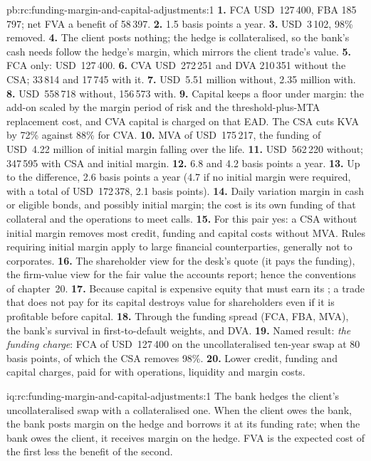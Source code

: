\begin{solution}{pb:rc:funding-margin-and-capital-adjustments:1}
\textbf{1.} FCA USD~127\,400, FBA 185\,797; net FVA a benefit of 58\,397.
\textbf{2.} 1.5 basis points a year.
\textbf{3.} USD~3\,102, 98\% removed.
\textbf{4.} The client posts nothing; the hedge is collateralised, so the bank's cash needs follow
the hedge's margin, which mirrors the client trade's value.
\textbf{5.} FCA only: USD~127\,400.
\textbf{6.} CVA USD~272\,251 and DVA 210\,351 without the CSA; 33\,814 and 17\,745 with it.
\textbf{7.} USD~5.51 million without, 2.35 million with.
\textbf{8.} USD~558\,718 without, 156\,573 with.
\textbf{9.} Capital keeps a floor under margin: the add-on scaled by the margin period of risk and
the threshold-plus-MTA replacement cost, and CVA capital is charged on that EAD. The CSA cuts
KVA by 72\% against 88\% for CVA.
\textbf{10.} MVA of USD~175\,217, the funding of USD~4.22 million of initial margin falling over
the life.
\textbf{11.} USD~562\,220 without; 347\,595 with CSA and initial margin.
\textbf{12.} 6.8 and 4.2 basis points a year.
\textbf{13.} Up to the difference, 2.6 basis points a year (4.7 if no initial margin were
required, with a total of USD~172\,378, 2.1 basis points).
\textbf{14.} Daily variation margin in cash or eligible bonds, and possibly initial margin; the
cost is its own funding of that collateral and the operations to meet calls.
\textbf{15.} For this pair yes: a CSA without initial margin removes most credit, funding and
capital costs without MVA. Rules requiring initial margin apply to large financial
counterparties, generally not to corporates.
\textbf{16.} The shareholder view for the desk's quote (it pays the funding), the firm-value view
for the fair value the accounts report; hence the conventions of chapter~20.
\textbf{17.} Because capital is expensive equity that must earn its ; a trade that does
not pay for its capital destroys value for shareholders even if it is profitable before capital.
\textbf{18.} Through the funding spread (FCA, FBA, MVA), the bank's survival in first-to-default
weights, and DVA.
\textbf{19.} Named result: \emph{the funding charge}: FCA of USD~127\,400 on the uncollateralised
ten-year swap at 80 basis points, of which the CSA removes 98\%.
\textbf{20.} Lower credit, funding and capital charges, paid for with operations, liquidity and
margin costs.
\end{solution}

\begin{solution}{iq:rc:funding-margin-and-capital-adjustments:1}
The bank hedges the client's uncollateralised swap with a collateralised one. When the client
owes the bank, the bank posts margin on the hedge and borrows it at its funding rate; when the
bank owes the client, it receives margin on the hedge. FVA is the expected cost of the first
less the benefit of the second.
\end{solution}

